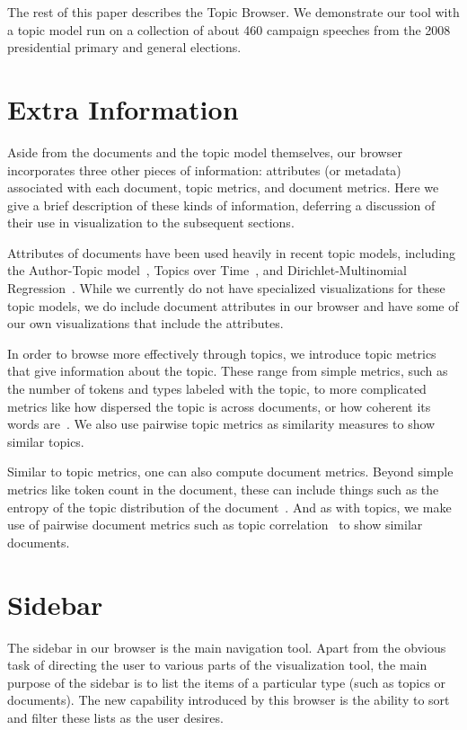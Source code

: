 \documentclass{article}
\begin{document}
The rest of this paper describes the Topic Browser.  We demonstrate our tool
with a topic model run on a collection of about 460 campaign speeches from the
2008 presidential primary and general elections.

\section{Extra Information}

Aside from the documents and the topic model themselves, our browser
incorporates three other pieces of information: attributes (or metadata)
associated with each document, topic metrics, and document metrics.  Here we
give a brief description of these kinds of information, deferring a discussion
of their use in visualization to the subsequent sections.

Attributes of documents have been used heavily in recent topic models,
including the Author-Topic model~\cite{rosen-zvi-2004-author-topic-model},
Topics over Time~\cite{wang-2006-topics-over-time}, and Dirichlet-Multinomial
Regression~\cite{mimno-2008-topic-models-with-arbitrary-features-dmr}.  While
we currently do not have specialized visualizations for these topic models, we
do include document attributes in our browser and have some of our own 
visualizations that include the attributes.

In order to browse more effectively through topics, we introduce topic metrics
that give information about the topic.  These range from simple metrics, such
as the number of tokens and types labeled with the topic, to more complicated
metrics like how dispersed the topic is across documents, or how coherent its
words are~\cite{newman-2010-automatic-evaluation-of-topic-coherence}.  We also
use pairwise topic metrics as similarity measures to show similar topics.

Similar to topic metrics, one can also compute document metrics.  Beyond simple
metrics like token count in the document, these can include things such as the
entropy of the topic distribution of the
document~\cite{misra-2008-lda-to-find-semantically-incoherent-documents}.  And
as with topics, we make use of pairwise document metrics such as topic
correlation~\cite{blei-2009-topic-models} to show similar documents.

\section{Sidebar}

The sidebar in our browser is the main navigation tool.  Apart from the obvious
task of directing the user to various parts of the visualization tool, the main
purpose of the sidebar is to list the items of a particular type (such as
topics or documents).  The new capability introduced by this browser is the
ability to sort and filter these lists as the user desires.
\end{document}
